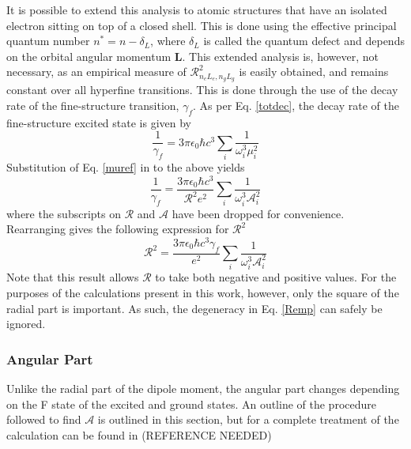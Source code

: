 It is possible to extend this analysis to atomic structures that have an isolated electron sitting on top of a closed shell. This is done using the effective principal quantum number $n^*= n - \delta_{L}$, where $\delta_{L}$ is called the quantum defect and depends on the orbital angular momentum \textbf{L}. This extended analysis is, however, not necessary, as an empirical measure of $ \mathcal{R}^2_{n_e L_e, n_g L_g}$ is easily obtained, and remains constant over all hyperfine transitions. This is done through the use of the decay rate of the fine-structure transition, $\gamma_f$. As per Eq. \ref{totdec}, the decay rate of the fine-structure excited state is given by
\begin{equation}
\frac{1}{\gamma_f} = 3 \pi \epsilon_0 \hbar c^3 \sum_i \frac{1}{\omega_i^3 \mu_i^2}
\end{equation}
Substitution of Eq. \ref{muref} in to the above yields
\begin{equation}
\frac{1}{\gamma_f} = \frac{3 \pi \epsilon_0 \hbar c^3}{\mathcal{R}^2e^2} \sum_i \frac{1}{\omega_i^3\mathcal{A}^2_i}
\end{equation}
where the subscripts on $\mathcal{R}$ and $\mathcal{A}$ have been dropped for convenience. Rearranging gives the following expression for $\mathcal{R}^2$
\begin{equation}
\mathcal{R}^2 = \frac{3 \pi \epsilon_0 \hbar c^3 \gamma_f}{e^2} \sum_i \frac{1}{\omega_i^3\mathcal{A}^2_i}
\label{Remp}
\end{equation}
Note that this result allows $\mathcal{R}$ to take both negative and positive values. For the purposes of the calculations present in this work, however, only the square of the radial part is important. As such, the degeneracy in Eq. \ref{Remp} can safely be ignored. 
\subsubsection*{Angular Part}
Unlike the radial part of the dipole moment, the angular part changes depending on the F state of the excited and ground states. An outline of the procedure followed to find $\mathcal{A}$ is outlined in this section, but for a complete treatment of the calculation can be found in (REFERENCE NEEDED) 

